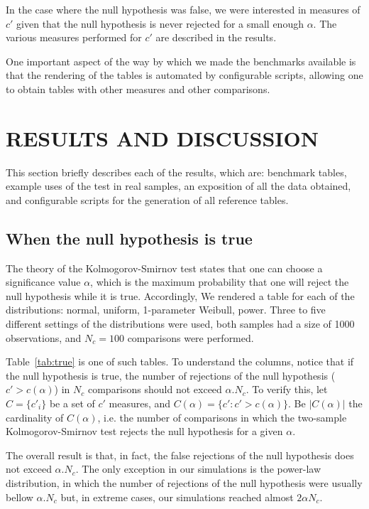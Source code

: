 \documentclass[12pt,fleqn]{article}
\begin{document}
In the case where the null hypothesis was false, 
we were interested in measures of $c'$ given that
the null hypothesis is never rejected for a small enough
$\alpha$.
The various measures performed for $c'$ are
described in the results.

One important aspect of the way by which we made the
benchmarks available is that the rendering of the tables
is automated by configurable scripts,
allowing one to obtain tables with other measures
and other comparisons.

\section{RESULTS AND DISCUSSION}\label{sec:res}
This section briefly describes each of the
results, which are: benchmark tables, example uses of the test in
real samples, an exposition of all the data obtained,
and configurable scripts for the generation of all reference tables.

\subsection{When the null hypothesis is true}
The theory of the Kolmogorov-Smirnov test
states that one can choose a significance value $\alpha$,
which is the maximum probability that one will reject the
null hypothesis while it is true.
Accordingly,
We rendered a table for each of the distributions:
normal, uniform, 1-parameter Weibull, power.
Three to five different settings of the distributions
were used, both samples had a size of 1000 observations,
and $N_c=100$ comparisons were performed.

Table~\ref{tab:true} is one of such tables.
To understand the columns, notice that
if the null hypothesis is true, the number
of rejections of the null hypothesis ($c'>c(\alpha)$)
in $N_c$ comparisons should not exceed $\alpha . N_c$.
To verify this, let $C=\{c'_i\}$ be a set of $c'$ measures,
and $C(\alpha)=\{c' : c'>c(\alpha)\}$.
Be $|C(\alpha)|$ the cardinality of $C(\alpha)$,
i.e. the number of comparisons in which the two-sample Kolmogorov-Smirnov
test rejects the null hypothesis for a given $\alpha$.

The overall result is that, in fact, the false rejections of the null hypothesis
does not exceed $\alpha . N_c$.
The only exception in our simulations is the power-law distribution,
in which the number of rejections of the null hypothesis were usually bellow $\alpha . N_c$
but, in extreme cases, our simulations reached almost $2\alpha N_c$.
\end{document}
